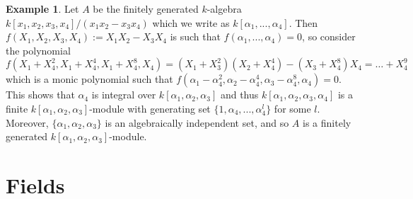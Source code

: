 \documentclass[12pt]{article}
\theoremstyle{plain}
\theoremstyle{definition}
\newtheorem{example}[thm]{Example}
\begin{document}
	\begin{example}
		Let $A$ be the finitely generated $k$-algebra $k[x_1,x_2,x_3,x_4]/(x_1x_2 - x_3x_4)$ which we write as $k[\alpha_1,...,\alpha_4]$. Then $f(X_1,X_2,X_3,X_4) := X_1X_2 - X_3X_4$ is such that $f(\alpha_1,...,\alpha_4) = 0$, so consider the polynomial
		\[f(X_1 + X_4^2,X_1 + X_4^{4}, X_1 + X_4^8, X_4) = (X_1 + X_3^2)(X_2 + X_4^4) - (X_3 + X_4^8)X_4 = \hdots + X_4^9\]
		which is a monic polynomial such that $f(\alpha_1 - \alpha_4^2, \alpha_2 - \alpha_4^4, \alpha_3 - \alpha_4^8, \alpha_4) = 0$. This shows that $\alpha_4$ is integral over $k[\alpha_1,\alpha_2,\alpha_3]$ and thus $k[\alpha_1,\alpha_2,\alpha_3,\alpha_4]$ is a finite $k[\alpha_1,\alpha_2,\alpha_3]$-module with generating set $\lbrace 1, \alpha_4,...,\alpha_4^l\rbrace$ for some $l$. Moreover, $\lbrace \alpha_1,\alpha_2,\alpha_3\rbrace$ is an algebraically independent set, and so $A$ is a finitely generated $k[\alpha_1,\alpha_2,\alpha_3]$-module.
	\end{example}
	\section{Fields}
\end{document}
